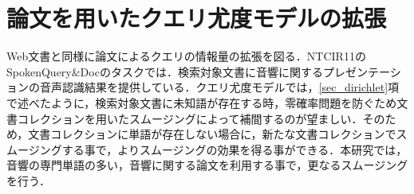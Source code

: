 




\section{論文を用いたクエリ尤度モデルの拡張}
Web文書と同様に論文によるクエリの情報量の拡張を図る．NTCIR11のSpokenQuery\&Docのタスクでは．検索対象文書に音響に関するプレゼンテーションの音声認識結果を提供している．クエリ尤度モデルでは，\ref{sec_dirichlet}項で述べたように，検索対象文書に未知語が存在する時，零確率問題を防ぐため文書コレクションを用いたスムージングによって補間するのが望ましい．そのため，文書コレクションに単語が存在しない場合に，新たな文書コレクションでスムージングする事で，よりスムージングの効果を得る事ができる．本研究では，音響の専門単語の多い，音響に関する論文を利用する事で，更なるスムージングを行う． 

